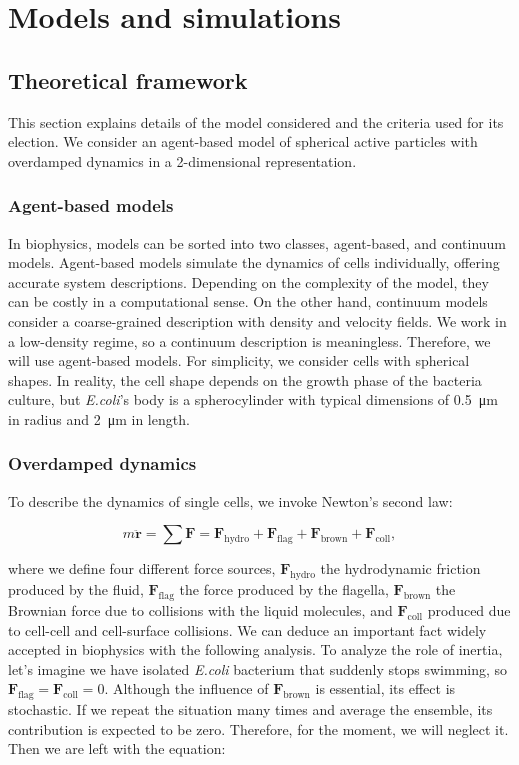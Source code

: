 \chapter{Models and simulations}

\section{Theoretical framework}

This section explains details of the model considered and the criteria used for its election. We consider an agent-based model of spherical active particles with overdamped dynamics in a 2-dimensional representation. 

\subsection{Agent-based models} 

In biophysics, models can be sorted into two classes, agent-based, and continuum models. Agent-based models simulate the dynamics of cells individually, offering accurate system descriptions. Depending on the complexity of the model, they can be costly in a computational sense. On the other hand, continuum models consider a coarse-grained description with density and velocity fields. We work in a low-density regime, so a continuum description is meaningless. Therefore, we will use agent-based models. For simplicity, we consider cells with spherical shapes. In reality, the cell shape depends on the growth phase of the bacteria culture, but \textit{E.coli}'s body is a spherocylinder with typical dimensions of \SI{0.5}{\micro\meter} in radius and \SI{2}{\micro\meter} in length.

\subsection{Overdamped dynamics}

To describe the dynamics of single cells, we invoke Newton's second law: 

\begin{equation}
	m\ddot{\textbf{r}} = \sum \textbf{F} = \textbf{F}_{\text{hydro}} + \textbf{F}_{\text{flag}} + \textbf{F}_{\text{brown}} + \textbf{F}_{\text{coll}} ,
\end{equation}

where we define four different force sources, $\textbf{F}_{\text{hydro}}$ the hydrodynamic friction produced by the fluid, $\textbf{F}_{\text{flag}}$ the force produced by the flagella, $\textbf{F}_{\text{brown}}$ the Brownian force due to collisions with the liquid molecules, and $\textbf{F}_{\text{coll}}$ produced due to cell-cell and cell-surface collisions. We can deduce an important fact widely accepted in biophysics with the following analysis. To analyze the role of inertia, let's imagine we have isolated \textit{E.coli} bacterium that suddenly stops swimming, so $\textbf{F}_{\text{flag}} = \textbf{F}_{\text{coll}} =0$. Although the influence of $\textbf{F}_{\text{brown}}$ is essential, its effect is stochastic. If we repeat the situation many times and average the ensemble, its contribution is expected to be zero. Therefore, for the moment, we will neglect it. Then we are left with the equation:

